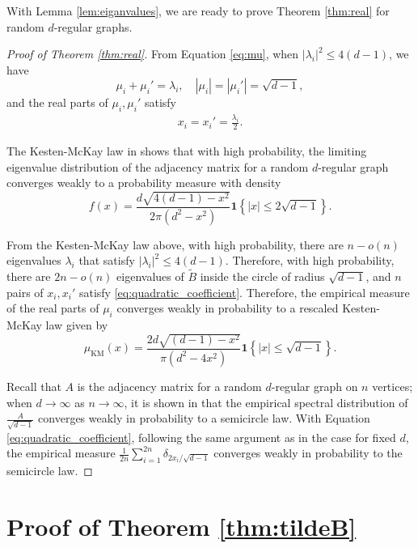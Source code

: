 \documentclass[11pt,reqno]{amsart}
\theoremstyle{definition}
\begin{document}
With Lemma \ref{lem:eiganvalues},  we are ready to prove Theorem \ref{thm:real} for random $d$-regular graphs.
\begin{proof}[Proof of Theorem \ref{thm:real}]
From Equation \eqref{eq:mu}, when $|\lambda_i|^2\leq 4(d-1)$, we have 
\[\mu_i+ \mu_i'=\lambda_i, \quad |\mu_i|=|\mu_i'|=\sqrt{d-1},\] and   the real parts of $\mu_i,\mu_i'$ satisfy
 \begin{align}\label{eq:quadratic_coefficient}
 x_i = x_i' = \frac{\lambda_i}{2}.
 \end{align}
 
The Kesten-McKay law  in \cite{MCKAY1981203} shows that with high probability,  the limiting eigenvalue distribution of the adjacency matrix for a random $d$-regular graph converges weakly to a probability measure with density
\[ f(x)=\frac{d\sqrt{4(d-1)-x^2}}{2\pi (d^2-x^2)} \mathbf{1} \left\{ |x|\leq 2\sqrt{d-1}\right\}.\]

From the Kesten-McKay law above, with high probability, there are $n-o(n)$ eigenvalues $\lambda_i$ {that} satisfy $|\lambda_i|^2\leq 4(d-1)$. Therefore, with high probability, there are $2n-o(n)$ eigenvalues of $\tilde B$ inside the circle of radius $\sqrt{d-1}$, and $n$ pairs of $x_i,x_i'$ satisfy \eqref{eq:quadratic_coefficient}. Therefore, the empirical measure of the real parts of $\mu_i$ converges weakly in probability to a rescaled Kesten-McKay law given by 
    \begin{equation}   
   \mu_{\mathrm{KM}}(x)=   \frac{ 2d\sqrt{(d-1)-x^2} }{\pi(d^2 - 4x^2)} \mathbf{1} \left\{ |x|\leq \sqrt{d-1}\right\}.
    \end{equation}

{Recall that $A$ is the adjacency matrix for a random $d$-regular graph on $n$ vertices;} when $d\to\infty$ as $n\to\infty$, it is shown in \cite{tran2013sparse,dumitriu2012sparse} that the empirical spectral distribution of $\frac{A}{\sqrt{d-1}}$ converges weakly in probability to a semicircle law. With  Equation \eqref{eq:quadratic_coefficient}, following  the same argument  as in the case for fixed $d$, the empirical measure  $\frac{1}{2n}\sum_{i=1}^{2n} \delta_{2x_i/\sqrt{d-1}}$ converges weakly in probability to the semicircle law.
\end{proof}




\section{Proof of Theorem \ref{thm:tildeB}}
\end{document}
